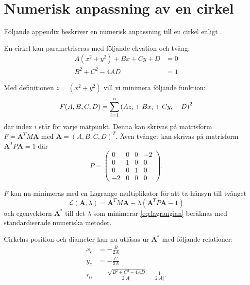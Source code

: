 \documentclass[../../main.tex]{subfiles}
\begin{document}
\chapter{Numerisk anpassning av en cirkel}
\label{sec:algebraisk}
Följande appendix beskriver en numerisk anpassning till en cirkel enligt \cite[kap. 4.2]{Chernov2005}.

En cirkel kan parametriseras med följande ekvation och tvång:
\begin{align}
    A(x^2+y^2)+Bx+Cy+D&=0\\
    B^2+C^2-4AD&=1
\end{align}

Med definitionen $z=(x^2+y^2)$ vill vi minimera följande funktion:
\begin{equation}
    F(A,B,C,D)=\sum_{i=1}^n \qty(Az_i+Bx_i+Cy_i+D)^2
\end{equation}
där index $i$ står för varje mätpunkt. Denna kan skrivas på matrisform $F=\mathbf{A}^TM\mathbf{A}$ med $\mathbf{A}=(A,B,C,D)^T$.
Även tvånget kan skrivas på matrisform $\mathbf{A}^TP\mathbf{A}=1$ där
\begin{equation*}
    P=\begin{pmatrix}
    0 & 0 & 0 &-2\\
    0 & 1 & 0 & 0 \\
    0 & 0 & 1 & 0\\
   -2 & 0 & 0 & 0
   \end{pmatrix}.
\end{equation*}

$F$ kan nu minimeras med en Lagrange multiplikator för att ta hänsyn till tvånget
\begin{equation}
    \mathcal{L}(\mathbf{A},\lambda)=\mathbf{A}^TM\mathbf{A}-\lambda(\mathbf{A}^TP\mathbf{A}-1)
    \label{eq:lagrangian}
\end{equation}
och egenvektorn $\mathbf{A}^*$ till det $\lambda$ som minimerar \eqref{eq:lagrangian} beräknas med standardiserade numeriska metoder.

Cirkelns position och diameter kan nu utläsas ur $\mathbf{A}^*$ med följande relationer:
\begin{align}
    x_c&=-\frac{B}{2A}\\
    y_c&=-\frac{C}{2A}\\
    r_0&=\frac{\sqrt{B^2+C^2-4AD}}{2|A|}=\frac{1}{2|A|}.
\end{align}
\end{document}
